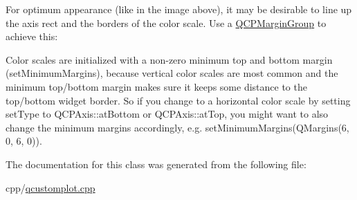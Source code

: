 For optimum appearance (like in the image above), it may be desirable to line up the axis rect and the borders of the color scale. Use a \mbox{\hyperlink{class_q_c_p_margin_group}{Q\+C\+P\+Margin\+Group}} to achieve this\+: 
\begin{DoxyCodeInclude}
\end{DoxyCodeInclude}
 Color scales are initialized with a non-\/zero minimum top and bottom margin (set\+Minimum\+Margins), because vertical color scales are most common and the minimum top/bottom margin makes sure it keeps some distance to the top/bottom widget border. So if you change to a horizontal color scale by setting set\+Type to Q\+C\+P\+Axis\+::at\+Bottom or Q\+C\+P\+Axis\+::at\+Top, you might want to also change the minimum margins accordingly, e.\+g. {\ttfamily set\+Minimum\+Margins(\+Q\+Margins(6, 0, 6, 0))}. 

The documentation for this class was generated from the following file\+:\begin{DoxyCompactItemize}
\item 
cpp/\mbox{\hyperlink{qcustomplot_8cpp}{qcustomplot.\+cpp}}\end{DoxyCompactItemize}
